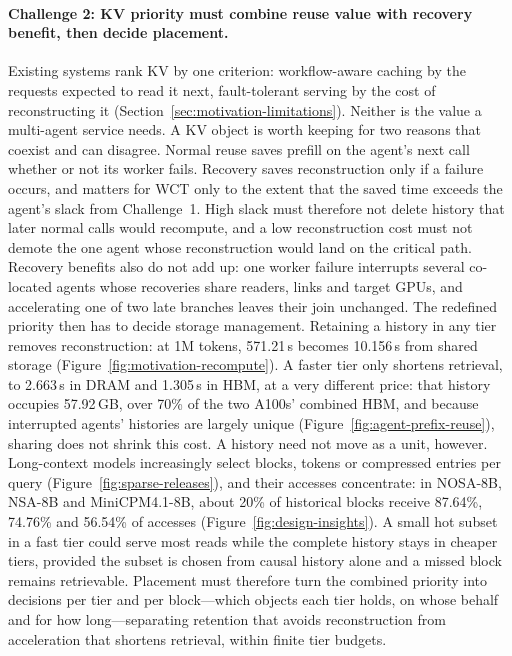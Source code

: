 \paragraph{Challenge 2: KV priority must combine reuse value with recovery benefit, then decide placement.}
Existing systems rank KV by one criterion: workflow-aware caching by the
requests expected to read it next, fault-tolerant serving by the cost of
reconstructing it (Section~\ref{sec:motivation-limitations}). Neither is
the value a multi-agent service needs. A KV object is worth keeping for
two reasons that coexist and can disagree. Normal reuse saves prefill on
the agent's next call whether or not its worker fails. Recovery saves
reconstruction only if a failure occurs, and matters for WCT only to the
extent that the saved time exceeds the agent's slack from
Challenge~1. High slack must therefore not delete history that later
normal calls would recompute, and a low reconstruction cost must not
demote the one agent whose reconstruction would land on the critical
path. Recovery benefits also do not add up: one worker failure
interrupts several co-located agents whose recoveries share readers,
links and target GPUs, and accelerating one of two late branches leaves
their join unchanged. The redefined priority then has to decide storage
management. Retaining a history in any tier removes reconstruction: at
1M tokens, 571.21\,s becomes 10.156\,s from shared storage
(Figure~\ref{fig:motivation-recompute}). A faster tier only shortens
retrieval, to 2.663\,s in DRAM and 1.305\,s in HBM, at a very different
price: that history occupies 57.92\,GB, over 70\% of the two A100s'
combined HBM, and because interrupted agents' histories are largely
unique (Figure~\ref{fig:agent-prefix-reuse}), sharing does not shrink
this cost. A history need not move as a unit, however. Long-context
models increasingly select blocks, tokens or compressed entries per
query (Figure~\ref{fig:sparse-releases}), and their accesses
concentrate: in NOSA-8B, NSA-8B and MiniCPM4.1-8B, about 20\% of
historical blocks receive 87.64\%, 74.76\% and 56.54\% of accesses
(Figure~\ref{fig:design-insights}). A small hot subset in a fast tier
could serve most reads while the complete history stays in cheaper
tiers, provided the subset is chosen from causal history alone and a
missed block remains retrievable. Placement must therefore turn the
combined priority into decisions per tier and per block---which objects
each tier holds, on whose behalf and for how long---separating
retention that avoids reconstruction from acceleration that shortens
retrieval, within finite tier budgets.

